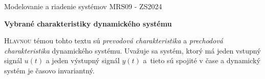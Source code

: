 \documentclass[a4paper, 10pt, ]{article}
\def\oznacenieCasti{MRS09 - ZS2024}
\begin{document}
\lstset{%
style=mystyle,
rangebeginprefix=\#\#\#\ cellB\ ,%
rangebeginsuffix=\ \#\#\#,%
rangeendprefix=\#\#\#\ cellE\ ,%
rangeendsuffix=\ \#\#\#,%
includerangemarker=false,
}





\fontsize{12pt}{22pt}\selectfont

\centerline{\textsf{Modelovanie a riadenie systémov} \hfill \textsf{\oznacenieCasti}}

\fontsize{18pt}{22pt}\selectfont





\begin{flushleft}
	\textbf{\textsf{Vybrané charakteristiky dynamického systému}}
\end{flushleft}





\normalsize

\bigskip

{\hypersetup{hidelinks}

\tableofcontents

}

\bigskip

\vspace{18pt}



\noindent
\lettrine[lines=3, nindent=0pt]{H}{lavnou} témou tohto textu sú \emph{prevodová charakteristika} a \emph{prechodová charakteristika} dynamického systému. Uvažuje sa systém, ktorý má jeden vstupný signál $u(t)$ a jeden výstupný signál $y(t)$ a~tieto sú spojité v čase a dynamický systém je časovo invariantný.




\end{document}
